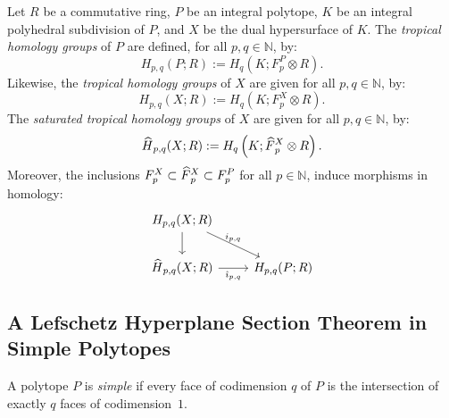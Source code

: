 \documentclass[AHL,Unicode,longabstracts,published]{cedram}
\newcommand{\N}{\mathbb{N}}
\newcommand{\Fbar}{\hat{F}}
\newcommand{\Hbar}{\hat{H}}
\newcommand{\ibar}{\hat{\imath}}
\let\oldhat\hat
\renewcommand*{\hat}[1]{\mathchoice{\widehat{#1}}{\widehat{#1}}{\oldhat{#1}}{\oldhat{#1}}}
\begin{document}
\begin{defi}\label{definition:trop_homology}
Let $R$ be a commutative ring, $P$ be an integral polytope, $K$ be an integral polyhedral subdivision of $P$, and $X$ be the dual hypersurface of $K$. The \emph{tropical homology groups} of $P$ are defined, for all $p,q\in\N$, by:
\begin{equation*}
H_{p,q}(P;R):=H_q\left(K;F_p^P\otimes R\right).
\end{equation*}
Likewise, the \emph{tropical homology groups} of $X$ are given for all $p,q\in\N$, by:
\begin{equation*}
H_{p,q}(X;R):=H_q\left(K;F_p^X\otimes R\right).
\end{equation*}
The \emph{saturated tropical homology groups} of $X$ are given for all $p,q\in\N$, by:
\begin{equation*}
\Hbar_{p,q}(X;R):=H_q\left(K;\Fbar_p^X\otimes R\right).
\end{equation*}
Moreover, the inclusions $F_p^X\subset \Fbar_p^X \subset F_p^P$ for all $p\in\N$, induce morphisms in homology:
\begin{equation*}
\begin{tikzcd}
H_{p,q}(X;R) \ar[rd, "i_{p,q}" above] \ar[d]& \\
\Hbar_{p,q}(X;R) \ar[r, "\ibar_{p,q}" below]& H_{p,q}(P;R)
\end{tikzcd}
\end{equation*}
\end{defi}

\subsection{A Lefschetz Hyperplane Section Theorem in Simple Polytopes}

\begin{defi}
A polytope $P$ is \emph{simple} if every face of codimension $q$ of $P$ is the intersection of exactly $q$ faces of codimension~$1$.
\end{defi}
\end{document}
